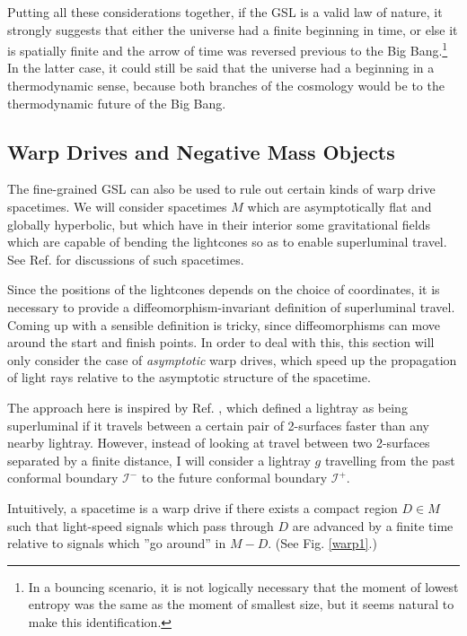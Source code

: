 \documentclass[12pt]{article}
\begin{document}
Putting all these considerations together, if the GSL is a valid law of nature, it strongly suggests that either the universe had a finite beginning in time, or else it is spatially finite and the arrow of time was reversed previous to the Big Bang.\footnote{In a bouncing scenario, it is not logically necessary that the moment of lowest entropy was the same as the moment of smallest size, but it seems natural to make this identification.}  In the latter case, it could still be said that the universe had a beginning in a thermodynamic sense, because both branches of the cosmology would be to the thermodynamic future of the Big Bang.

\subsection{Warp Drives and Negative Mass Objects}\label{warp}

The fine-grained GSL can also be used to rule out certain kinds of warp drive spacetimes.  We will consider spacetimes $M$ which are asymptotically flat and globally hyperbolic, but which have in their interior some gravitational fields which are capable of bending the lightcones so as to enable superluminal travel.  See Ref. \cite{warps} for discussions of such spacetimes.

Since the positions of the lightcones depends on the choice of coordinates, it is necessary to provide a diffeomorphism-invariant definition of superluminal travel.  Coming up with a sensible definition is tricky, since diffeomorphisms can move around the start and finish points.  In order to deal with this, this section will only consider the case of \textit{asymptotic} warp drives, which speed up the propagation of light rays relative to the asymptotic structure of the spacetime.  

The approach here is inspired by Ref. \cite{olum}, which defined a lightray as being superluminal if it travels between a certain pair of 2-surfaces faster than any nearby lightray.  However, instead of looking at travel between two 2-surfaces separated by a finite distance, I will consider a lightray $g$ travelling from the past conformal boundary $\mathcal{I}^-$ to the future conformal boundary $\mathcal{I}^+$.

Intuitively, a spacetime is a warp drive if there exists a compact region $D \in M$ such that light-speed signals which pass through $D$ are advanced by a finite time relative to signals which ''go around'' in $M - D$.  (See Fig. \ref{warp1}.)
\end{document}
